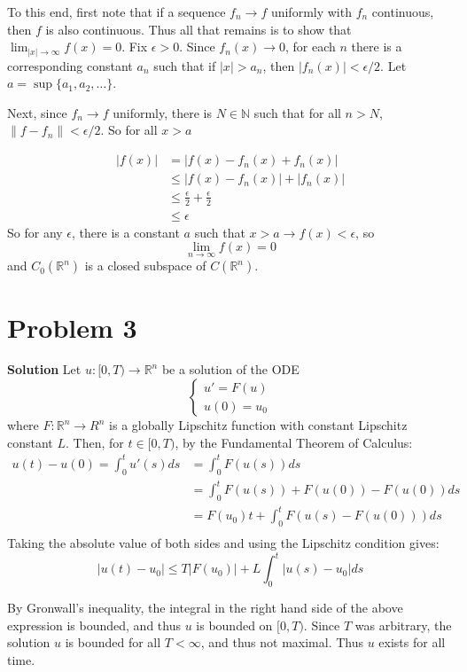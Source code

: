 \documentclass{article}
\newcommand{\R}{\mathbb{R}}
\newcommand{\N}{\mathbb{N}}
\begin{document}
To this end, first note that if a sequence $f_n \rightarrow f$ uniformly with $f_n$ continuous, then $f$ is also continuous. Thus all that remains is to show that
\( \lim_{|x| \rightarrow \infty} f(x) = 0  \). Fix $\epsilon > 0$. Since $f_n(x) \rightarrow 0$, for each $n$ there is a corresponding constant $a_n$ such that if $|x| > a_n$, then
$|f_n(x)| < \epsilon /2 $. Let $a = \sup \{a_1, a_2, \ldots\}$.  

Next, since $f_n \rightarrow f$ uniformly, there is $N \in \N$ such that for all $n > N$, $ \| f - f_n \| < \epsilon/2$. So for all $ x > a$

\begin{align*}
    | f(x) | &= | f(x) - f_n(x) + f_n(x) | \\
    & \leq | f(x) - f_n(x) | + |f_n(x) | \\
    & \leq \frac{\epsilon}{2} + \frac{\epsilon}{2} \\
    & \leq \epsilon
\end{align*} 
So for any $\epsilon$, there is a constant $a$ such that $x > a \rightarrow f(x) < \epsilon$, so 
\[ \lim_{n \rightarrow \infty} f(x) = 0\] and $C_0(\R^n)$ is a closed subspace of $C(\R^n)$. 

\section{Problem 3}

\textbf{Solution} Let $u: [0, T  ) \to \R^n$ be a solution of the ODE 
\begin{equation*}
    \begin{cases}
        u' = F(u) \\
        u(0) = u_0
    \end{cases}
\end{equation*}
 where $F : \R^n \to R^n$ is a globally Lipschitz function with constant Lipschitz constant $L$. Then, for $t \in [0, T)$,  by the Fundamental Theorem of Calculus:
\begin{align*}
u(t) - u(0) = \int_0^t u'(s) ds &= \int_0^t F(u(s))ds \\
&= \int_0^t F(u(s)) + F(u(0)) - F(u(0)) ds \\
&= F(u_0)t + \int_0^t F(u(s) - F(u(0))) ds \\
\end{align*} Taking the absolute value of both sides and using the Lipschitz condition gives:
\[|u(t) - u_0| \leq T |F(u_0)| + L \int_0^t |u(s) - u_0  |ds \] 

By Gronwall's inequality, the integral in the right hand side of the above expression is bounded, and thus $u$ is bounded on $[0,  T)$. Since $T$ was arbitrary, the solution $u$ is bounded for all $T < \infty$, and thus not maximal. Thus $u$ exists for all time. 
\end{document}
